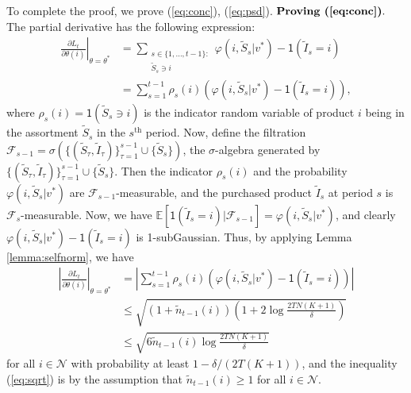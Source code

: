 \documentclass{article}
\theoremstyle{definition}
\newcommand{\EEE}{\mathbb{E}}
\newcommand{\FFF}{\mathcal{F}}
\newcommand{\NNN}{\mathcal{N}}
\begin{document}
To complete the proof, we prove (\ref{eq:conc}), (\ref{eq:psd}). $\textbf{Proving (\ref{eq:conc})}.$ The partial derivative has the following expression:
\begin{align}
\left.\frac{\partial L_t}{\partial \theta(i)}\right|_{\theta=\theta^*} &= \sum_{\substack{s\in \{1, \ldots, t-1\}: \\ \tilde{S}_s \ni i}}\varphi(i, \tilde{S}_s | v^*) - \mathsf{1}(\tilde{I}_s = i) \nonumber\\
&=\sum^{t-1}_{s=1} \rho_s(i)\left(\varphi(i, \tilde{S}_s | v^*) - \mathsf{1}(\tilde{I}_s = i)\right),\nonumber
\end{align}
where $\rho_s(i) = \mathsf{1}(\tilde{S}_s \ni i)$ is the indicator random variable of product $i$ being in the assortment $\tilde{S}_s$ in the $s^\text{th}$ period. Now, define the filtration $\FFF_{s-1} = \sigma(\{(\tilde{S}_\tau, \tilde{I}_\tau)\}^{s-1}_{\tau = 1}\cup \{\tilde{S}_s\})$, the $\sigma$-algebra generated by $\{(\tilde{S}_\tau, \tilde{I}_\tau)\}^{s-1}_{\tau = 1}\cup \{\tilde{S}_s\}$. Then the indicator $\rho_s(i)$ and the probability $\varphi(i, \tilde{S}_s | v^*)$ are $\FFF_{s-1}$-measurable, and the purchased product $\tilde{I}_s$ at period $s$ is $\FFF_s$-measurable. Now, we have $\EEE[\mathsf{1}(\tilde{I}_s = i)| \FFF_{s-1}] = \varphi(i, \tilde{S}_s | v^*)$, and clearly $\varphi(i, \tilde{S}_s | v^*) - \mathsf{1}(\tilde{I}_s = i)$ is 1-subGaussian. Thus, by applying Lemma \ref{lemma:selfnorm}, we have
\begin{align}
\left|\frac{\partial L_t}{\partial \theta(i)}\right|_{\theta = \theta^*} &= \left|\sum^{t-1}_{s=1} \rho_s(i)\left(\varphi(i, \tilde{S}_s | v^*) - \mathsf{1}(\tilde{I}_s = i)\right)\right| \nonumber\\
&\leq \sqrt{\left(1 + \tilde{n}_{t-1}(i)\right)\left(1 + 2\log\frac{2TN(K+1)}{\delta}\right)}\nonumber\\
&\leq \sqrt{6 \tilde{n}_{t-1}(i)\log\frac{2TN(K+1)}{\delta}} \label{eq:sqrt}
\end{align}
for all $i\in \NNN$ with probability at least $1-\delta/(2T(K+1))$, and the inequality (\ref{eq:sqrt}) is by the assumption that $\tilde{n}_{t-1}(i)\geq 1$ for all $i\in \NNN$.
\end{document}

